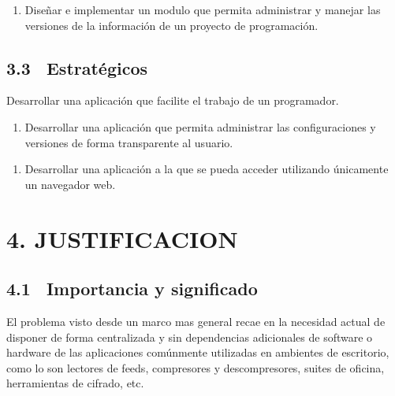 \documentclass[12pt,letterpaper,oneside]{article}
\begin{document}
\bigskip


\begin{enumerate}
\item Diseñar e implementar un modulo que permita administrar y
manejar las versiones de la información de un proyecto de
programación.
\end{enumerate}

\bigskip

\subsection[3.3 \ Estratégicos]{3.3 \ Estratégicos}

\bigskip
Desarrollar una aplicación que facilite el trabajo de un programador.

\bigskip


\begin{enumerate}
\item Desarrollar una aplicación que permita administrar las
configuraciones y versiones de forma transparente al usuario.
\end{enumerate}

\bigskip


\begin{enumerate}
\item Desarrollar una aplicación a la que se pueda acceder utilizando
únicamente un navegador web.
\end{enumerate}

\bigskip


\bigskip


\bigskip


\bigskip


\bigskip


\bigskip


\bigskip


\bigskip


\bigskip

\section{4. JUSTIFICACION}

\bigskip

\subsection[4.1 \ Importancia y significado]{4.1 \ Importancia y
significado}

\bigskip

El problema visto desde un marco mas general recae en la necesidad
actual de disponer de forma centralizada y sin dependencias adicionales
de software o hardware de las aplicaciones comúnmente utilizadas en
ambientes de escritorio, como lo son lectores de feeds, compresores y
descompresores, suites de oficina, herramientas de cifrado, etc.
\end{document}
